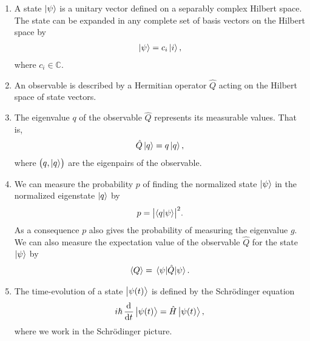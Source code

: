         \begin{enumerate}
            \item A state $\ket{\psi}$ is a unitary vector defined on a
                separably complex Hilbert space.
                The state can be expanded in any complete set of basis vectors
                on the Hilbert space by
                \begin{align}
                    \ket{\psi} = c_i\ket{i},
                \end{align}
                where $c_i \in \mathbb{C}$.
            \item An observable is described by a Hermitian operator $\hat{Q}$
                acting on the Hilbert space of state vectors.
            \item The eigenvalue $q$ of the observable $\hat{Q}$ represents its
                measurable values.
                That is,
                \begin{align}
                    \hat{Q}\ket{q} = q\ket{q},
                \end{align}
                where $\left( q, \ket{q} \right)$ are the eigenpairs of the observable.
            \item We can measure the probability $p$ of finding the normalized
                state $\ket{\psi}$ in the normalized eigenstate $\ket{q}$ by
                \begin{align}
                    p = \abs{\braket{q}{\psi}}^2.
                \end{align}
                As a consequence $p$ also gives the probability of measuring the
                eigenvalue $g$.
                We can also measure the expectation value of the observable
                $\hat{Q}$ for the state $\ket{\psi}$ by
                \begin{align}
                    \expval{Q} = \expval{\hat{Q}}{\psi}.
                \end{align}
            \item The time-evolution of a state $\ket{\psi(t)}$ is defined by
                the Schrödinger equation
                \begin{align}
                    i\hslash \dod[]{}{t}\ket{\psi(t)} = \hamil\ket{\psi(t)},
                \end{align}
                where we work in the Schrödinger picture.
        \end{enumerate}

